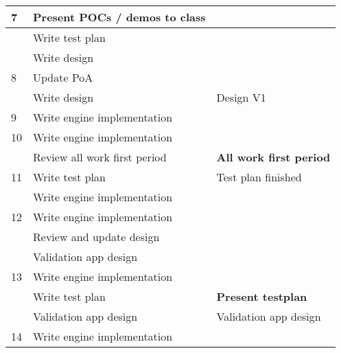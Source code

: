 \documentclass{article} %
\begin{document}
\begin{longtable}{|l|p{}|p{}|}
    7                    & Present POCs / demos to class             &                                         \\ \hline
                         & Write test plan                           &                                         \\ \hline
                         & Write design                              &                                         \\ \hline
    8                    & Update PoA                                &                                         \\ \hline
                         & Write design                              & Design V1                               \\ \hline
    9                    & Write engine implementation               &                                         \\ \hline
    10                   & Write engine implementation               &                                         \\ \hline
                         & Review all work first period              & \textbf{All work first period}          \\ \hline
    11                   & Write test plan                           & Test plan finished                      \\ \hline
                         & Write engine implementation               &                                         \\ \hline
    12                   & Write engine implementation               &                                         \\ \hline
                         & Review and update design                  &                                         \\ \hline
                         & Validation app design                     &                                         \\ \hline
    13                   & Write engine implementation               &                                         \\ \hline
                         & Write test plan                           & \textbf{Present testplan}               \\ \hline
                         & Validation app design                     & Validation app design                   \\ \hline
    14                   & Write engine implementation               &                                         \\ \hline

\end{longtable}
\end{document}
